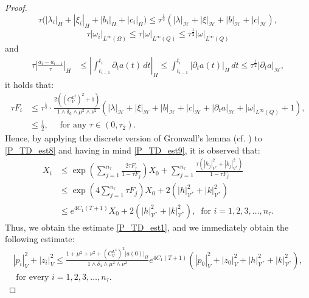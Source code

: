 \documentclass{sinst}
\numberwithin{equation}{section}
\theoremstyle{plain}
\theoremstyle{definition}
\def\sH{\mathscr{H}}
\def\sV{\mathscr{V}}
\begin{document}
\begin{proof}
\begin{equation}
    \tau \bigl( |\lambda_i|_H + |\xi_i|_H + |b_i|_H + |c_i|_H \bigr) \leq \tau^{\frac{1}{2}} (|\lambda|_\sH + |\xi|_\sH + |b|_\sH + |c|_\sH),
  \end{equation}
  \begin{equation}
    \tau|\omega_i|_{L^\infty(\Omega)} \leq \tau |\omega|_{L^\infty(Q)} \leq \tau^{\frac{1}{2}}|\omega|_{L^\infty(Q)}
  \end{equation}
  and 
  \begin{align}
    \tau \left| \frac{a_i - a_{i-1}}{\tau} \right|_H &\leq \left| \int_{t_{i-1}}^{t_i} \partial_t a(t) \,dt \right|_H \leq \int_{t_{i-1}}^{t_i} |\partial_t a(t)|_H \,dt \leq \tau^{\frac{1}{2}} |\partial_t a|_\sH,
  \end{align}
  it holds that:
  \begin{align}
    \tau F_i &\leq \tau^{\frac{1}{2}} \cdot \frac{2((C_V^{L^4})^2 + 1)}{1 \wedge \delta_a \wedge \mu^2 \wedge \nu^2} \left( |\lambda|_\sH + |\xi|_\sH + |b|_\sH + |c|_\sH + \left| \partial_t a \right|_\sH + |\omega|_{L^\infty(Q)} + 1 \right),
    \\
    &\leq \frac{1}{2}, \quad \mbox{ for any } \tau \in (0,\tau_2). \label{P_TD_est9}
  \end{align}
  Hence, by applying the discrete version of Gronwall's lemma (cf. \cite[Section 3.1]{emmrich1999discrete}) to \eqref{P_TD_est8} and having in mind \eqref{P_TD_est9}, it is observed that:
  \begin{align}
    X_i &\leq \exp\left( \sum_{j=1}^{n_\tau} \frac{2\tau F_j}{1 - \tau F_j} \right) X_0  + \sum_{j=1}^{n_\tau} \frac{\tau (|h_j|_{V^*}^2 + |k_j|_{V^*}^2)}{1 - \tau F_j}
    \\
    &\leq \exp\left( 4 \sum_{j=1}^{n_\tau} \tau F_j \right) X_0 + 2 (|h|_{\sV^*}^2 + |k|_{\sV^*}^2)
    \\
    &\leq e^{4 C_1 (T + 1)} X_0 + 2 (|h|_{\sV^*}^2 + |k|_{\sV^*}^2), \ \mbox{ for } i = 1,2,3, \dots, n_\tau.
  \end{align}
  Thus, we obtain the estimate \eqref{P_TD_est1}, and we immediately obtain the following estimate:
  \begin{gather}
    |p_i|_V^2 + |z_i|_V^2 \leq \frac{1 + \mu^2 + \nu^2 + (C_V^{L^4})^2|a(0)|_H}{1 \wedge \delta_a \wedge \mu^2 \wedge \nu^2}e^{4 C_1 (T+1)}(|p_0|_V^2 + |z_0|_V^2 + |h|_{\sV^*}^2 + |k|_{\sV^*}^2),
    \\
    \mbox{ for every } i = 1,2,3,\dots, n_\tau.
  \end{gather}


\end{proof}
\end{document}
